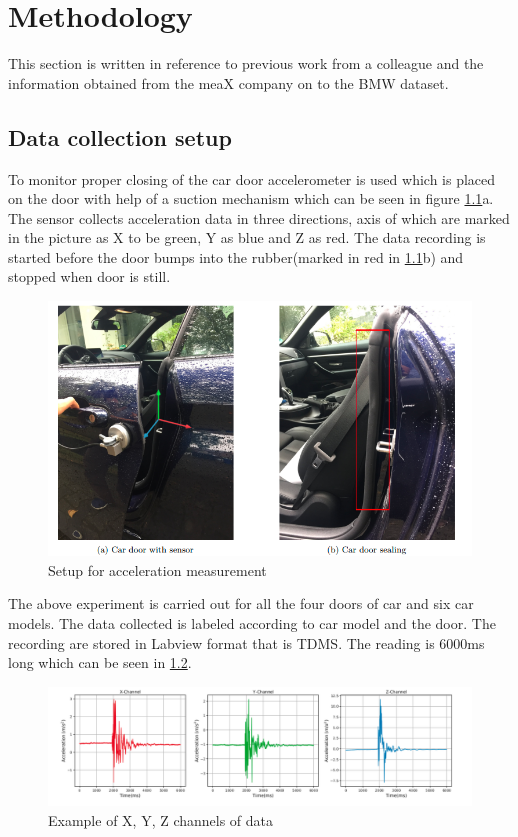

    \chapter{Methodology}
   This section is written in reference to previous work from a colleague and the information obtained from the meaX company on to the BMW dataset.

    \section{Data collection setup}
    To monitor proper closing of the car door accelerometer is used which is placed on the door with help of a suction mechanism which can be seen in figure \ref{n1}a. The sensor collects acceleration data in three directions, axis of which are marked in the picture as X to be green, Y as blue and Z as red. The data recording is started before the door bumps into the rubber(marked in red in \ref{n1}b) and stopped when door is still. 
        \begin{figure}[h]
        	\centering
        	\includegraphics[width=0.9\linewidth]{images/cardoor.png}
        	\caption{Setup for acceleration measurement}
        	\label{n1}
        \end{figure}
        
   The above experiment is carried out for all the four doors of car and six car models. The data collected is labeled according to car model and the door. The recording are stored in Labview format that is TDMS. The reading is 6000ms long which can be seen in \ref{n2}. 
   
   \begin{figure}[h]
   	\centering
   	\includegraphics[width=0.9\linewidth]{images/signal.png}
   	\caption{Example of X, Y, Z channels of data}
   	\label{n2}
   \end{figure}
